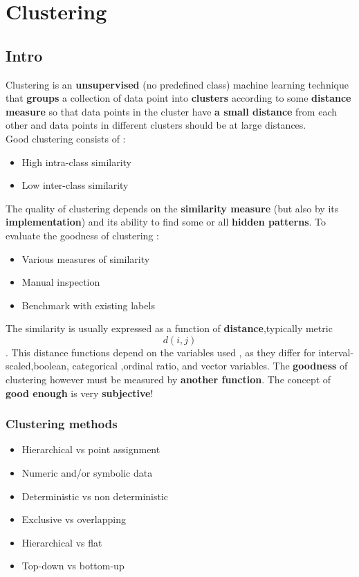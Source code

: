 \newpage
\section{Clustering}
\subsection{Intro}
Clustering is an \textbf{unsupervised} (no predefined class) machine learning technique that \textbf{groups} a collection of data point into \textbf{clusters} according to some \textbf{distance measure} so that data points in the cluster have \textbf{a small distance} from each other and data points in different clusters should be at large distances.\\
Good clustering consists of :
\begin{itemize}
\item High intra-class similarity
\item Low inter-class similarity
\end{itemize}
The quality of clustering depends on the \textbf{similarity measure} (but also by its \textbf{implementation}) and its ability to find some or all \textbf{hidden patterns}.
To evaluate the goodness of clustering :
\begin{itemize}
\item Various measures of similarity
\item Manual inspection
\item Benchmark with existing labels
\end{itemize}
The similarity is usually expressed as a function of \textbf{distance},typically metric $$ d(i,j)$$. This distance functions depend on the variables used , as they differ for interval-scaled,boolean, categorical ,ordinal ratio, and vector variables.  The \textbf{goodness} of clustering however must be measured by \textbf{another function}. The concept of \textbf{good enough} is very \textbf{subjective}!

\subsubsection{Clustering methods}
\begin{itemize}
\item Hierarchical vs point assignment
\item Numeric and/or symbolic data
\item Deterministic vs non deterministic
\item Exclusive vs overlapping
\item Hierarchical vs flat
\item Top-down vs bottom-up
\end{itemize}

